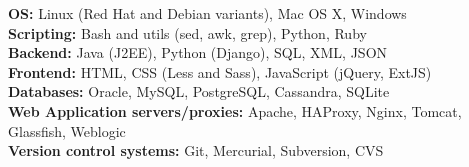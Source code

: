 \documentclass[margin,line]{resume}
\begin{document}
\begin{resume}
    \textbf{OS:} Linux (Red Hat and Debian variants), Mac OS X, Windows \\
    \textbf{Scripting:} Bash and utils (sed, awk, grep), Python, Ruby\\
    \textbf{Backend:} Java (J2EE), Python (Django), SQL, XML, JSON\\
    \textbf{Frontend:} HTML, CSS (Less and Sass), JavaScript (jQuery, ExtJS)\\
    \textbf{Databases:} Oracle, MySQL, PostgreSQL, Cassandra, SQLite\\
    \textbf{Web Application servers/proxies:} Apache, HAProxy, Nginx, Tomcat, Glassfish, Weblogic\\
    \textbf{Version control systems:} Git, Mercurial, Subversion, CVS\\
\end{resume}
\end{document}
